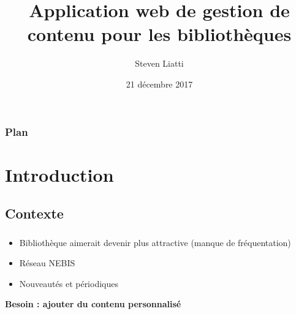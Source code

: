 \documentclass[10pt]{beamer}
\begin{document}

\title{Application web de gestion de contenu pour les bibliothèques}
\author{Steven Liatti}
\date{21 décembre 2017}

\begin{frame}
\titlepage
\end{frame}

\begin{frame}
    \frametitle{Plan}
	\setcounter{tocdepth}{3}
	\tableofcontents
\end{frame}

\section{Introduction}
\subsection{Contexte}
\begin{frame}
	\frametitle{\secname}
	\framesubtitle{\subsecname}
    \begin{itemize}
        \item Bibliothèque aimerait devenir plus attractive (manque de fréquentation)
        \item Réseau NEBIS
        \item Nouveautés et périodiques
    \end{itemize}
    \Large\textbf{Besoin : ajouter du contenu personnalisé}
\end{frame}
\end{document}
